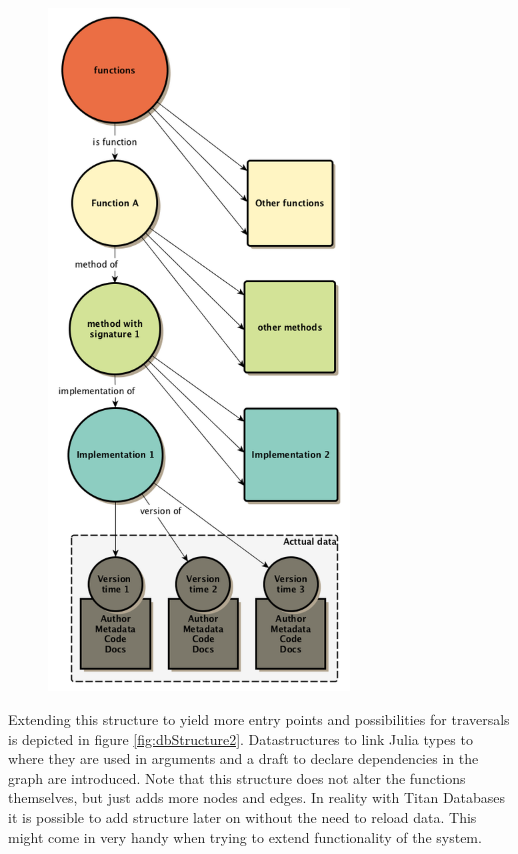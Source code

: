 \documentclass[twoside, 11pt]{scrartcl}
\begin{document}
\begin{figure}[h!]
	{\includegraphics[width=8cm]{figures/dbStructure1}}
\end{figure}

Extending this structure to yield more entry points and possibilities for traversals is depicted in figure \ref{fig:dbStructure2}. Datastructures to link Julia types to where they are used in arguments and a draft to declare dependencies in the graph are introduced. Note that this structure does not alter the functions themselves, but just adds more nodes and edges. In reality with Titan Databases it is possible to add structure later on without the need to reload data. This might come in very handy when trying to extend functionality of the system.
\end{document}
